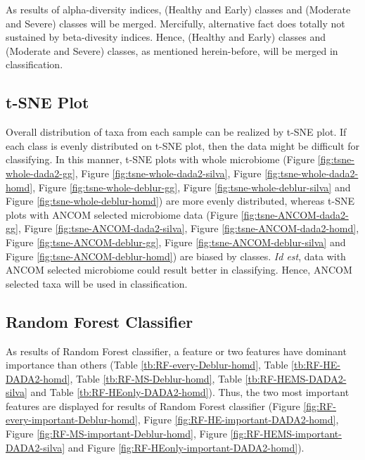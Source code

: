 \documentclass[a4paper]{article}
\begin{document}
            As results of alpha-diversity indices, (Healthy and Early) classes and (Moderate and Severe) classes will be merged. Mercifully, alternative fact does totally not sustained by beta-divesity indices. Hence, (Healthy and Early) classes and (Moderate and Severe) classes, as mentioned herein-before, will be merged in classification.

        \subsection{t-SNE Plot}
            Overall distribution of taxa from each sample can be realized by t-SNE plot. If each class is evenly distributed on t-SNE plot, then the data might be difficult for classifying. In this manner, t-SNE plots with whole microbiome (Figure \ref{fig:tsne-whole-dada2-gg}, Figure \ref{fig:tsne-whole-dada2-silva}, Figure \ref{fig:tsne-whole-dada2-homd}, Figure \ref{fig:tsne-whole-deblur-gg}, Figure \ref{fig:tsne-whole-deblur-silva} and Figure \ref{fig:tsne-whole-deblur-homd}) are more evenly distributed, whereas t-SNE plots with ANCOM selected microbiome data (Figure \ref{fig:tsne-ANCOM-dada2-gg}, Figure \ref{fig:tsne-ANCOM-dada2-silva}, Figure \ref{fig:tsne-ANCOM-dada2-homd}, Figure \ref{fig:tsne-ANCOM-deblur-gg}, Figure \ref{fig:tsne-ANCOM-deblur-silva} and Figure \ref{fig:tsne-ANCOM-deblur-homd}) are biased by classes. \textit{Id est}, data with ANCOM selected microbiome could result better in classifying. Hence, ANCOM selected taxa will be used in classification.

        \subsection{Random Forest Classifier}
            As results of Random Forest classifier, a feature or two features have dominant importance than others (Table \ref{tb:RF-every-Deblur-homd}, Table \ref{tb:RF-HE-DADA2-homd}, Table \ref{tb:RF-MS-Deblur-homd}, Table \ref{tb:RF-HEMS-DADA2-silva} and Table \ref{tb:RF-HEonly-DADA2-homd}). Thus, the two most important features are displayed for results of Random Forest classifier (Figure \ref{fig:RF-every-important-Deblur-homd}, Figure \ref{fig:RF-HE-important-DADA2-homd}, Figure \ref{fig:RF-MS-important-Deblur-homd}, Figure \ref{fig:RF-HEMS-important-DADA2-silva} and Figure \ref{fig:RF-HEonly-important-DADA2-homd}).

    
    
\end{document}
